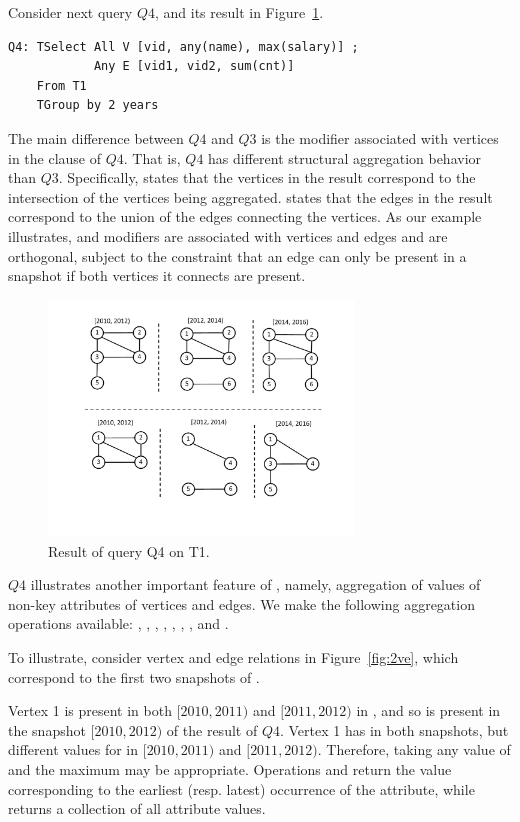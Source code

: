 Consider next query $Q4$, and its result in
Figure~\ref{fig:tg_all_any}.

\begin{verbatim}
Q4: TSelect All V [vid, any(name), max(salary)] ; 
            Any E [vid1, vid2, sum(cnt)] 
    From T1 
    TGroup by 2 years
\end{verbatim}

The main difference between $Q4$ and $Q3$ is the  modifier
associated with vertices in the  clause of $Q4$.  That
is, $Q4$ has different structural aggregation behavior than $Q3$.
Specifically,  states that the vertices in the result
correspond to the intersection of the vertices being aggregated.
 states that the edges in the result correspond to the
union of the edges connecting the vertices.  As our example
illustrates,  and  modifiers are associated with
vertices and edges and are orthogonal, subject to the constraint that
an edge can only be present in a snapshot if both vertices it connects
are present.

\begin{figure}
\includegraphics[width=3.2in]{figs/TGroupAllAny.pdf}
\caption{Result of query Q4 on T1.}
\label{fig:tg_all_any}
\end{figure}

$Q4$ illustrates another important feature of \ql, namely, aggregation
of values of non-key attributes of vertices and edges.  We make the
following aggregation operations available: ,
, , , , ,
, and .

To illustrate, consider vertex and edge relations in
Figure~\ref{fig:2ve}, which correspond to the first two snapshots of
.  

Vertex 1 is present in both $[2010, 2011)$ and $[2011, 2012)$ in
, and so is present in the snapshot $[2010, 2012)$ of the
result of $Q4$.  Vertex 1 has  in both
snapshots, but different values for  in $[2010, 2011)$
and $[2011, 2012)$.  Therefore, taking any value of  and
the maximum  may be appropriate.  Operations
 and  return the value corresponding to the
earliest (resp. latest) occurrence of the attribute, while
 returns a collection of all attribute values.

